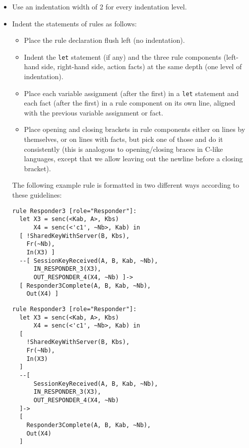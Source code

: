 \begin{itemize}

\item Use an indentation width of 2 for every indentation level.

\item Indent the statements of rules as follows:

\begin{itemize}

    \item Place the rule declaration flush left (no indentation).

    \item Indent the \texttt{let} statement (if any) and the three rule components (left-hand side, right-hand side, action facts) at the same depth (one level of indentation).

    \item Place each variable assignment (after the first) in a \texttt{let} statement and each fact (after the first) in a rule component on its own line, aligned with the previous variable assignment or fact.

    \item Place opening and closing brackets in rule components either on lines by themselves, or on lines with facts, but pick one of those and do it consistently (this is analogous to opening/closing braces in C-like languages, except that we allow leaving out the newline before a closing bracket).

\end{itemize}

The following example rule is formatted in two different ways according to these guidelines:

\begin{center}
\begin{minipage}{0.6\linewidth}
\begin{lstlisting}
rule Responder3 [role="Responder"]:
  let X3 = senc(<Kab, A>, Kbs)
      X4 = senc(<'c1', ~Nb>, Kab) in
  [ !SharedKeyWithServer(B, Kbs),
    Fr(~Nb),
    In(X3) ]
  --[ SessionKeyReceived(A, B, Kab, ~Nb),
      IN_RESPONDER_3(X3),
      OUT_RESPONDER_4(X4, ~Nb) ]->
  [ Responder3Complete(A, B, Kab, ~Nb),
    Out(X4) ]
\end{lstlisting}
\end{minipage}

\begin{minipage}{0.6\linewidth}
\begin{lstlisting}
rule Responder3 [role="Responder"]:
  let X3 = senc(<Kab, A>, Kbs)
      X4 = senc(<'c1', ~Nb>, Kab) in
  [ 
    !SharedKeyWithServer(B, Kbs),
    Fr(~Nb),
    In(X3) 
  ]
  --[ 
      SessionKeyReceived(A, B, Kab, ~Nb),
      IN_RESPONDER_3(X3),
      OUT_RESPONDER_4(X4, ~Nb) 
  ]->
  [ 
    Responder3Complete(A, B, Kab, ~Nb),
    Out(X4) 
  ]
\end{lstlisting}    
\end{minipage}
\end{center}


\end{itemize}

